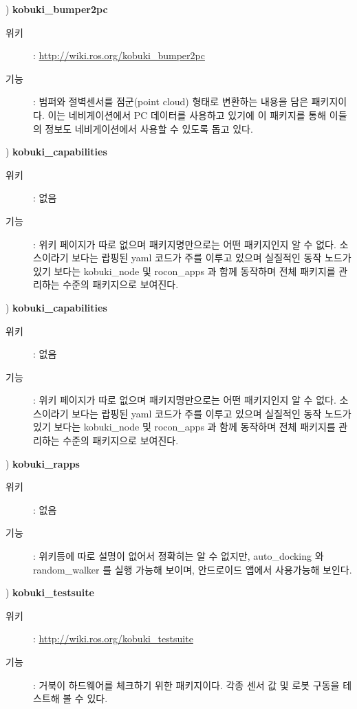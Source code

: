 \vspace{\baselineskip}
\noindent{}
\thenum) \textbf{kobuki\_bumper2pc}
\begin{description}
\item[위키]: \url{http://wiki.ros.org/kobuki_bumper2pc}
\item[기능]: 범퍼와 절벽센서를 점군(point cloud) 형태로 변환하는 내용을 담은 패키지이다. 이는 네비게이션에서 PC 데이터를 사용하고 있기에 이 패키지를 통해 이들의 정보도 네비게이션에서 사용할 수 있도록 돕고 있다.
\end{description}

\vspace{\baselineskip}
\noindent{}
\thenum) \textbf{kobuki\_capabilities}
\begin{description}
\item[위키]: 없음
\item[기능]: 위키 페이지가 따로 없으며 패키지명만으로는 어떤 패키지인지 알 수 없다. 소스이라기 보다는 랍핑된 yaml 코드가 주를 이루고 있으며 실질적인 동작 노드가 있기 보다는 kobuki\_node 및 rocon\_apps 과 함께 동작하며 전체 패키지를 관리하는 수준의 패키지으로 보여진다.
\end{description}

\vspace{\baselineskip}
\noindent{}
\thenum) \textbf{kobuki\_capabilities}
\begin{description}
\item[위키]: 없음
\item[기능]: 위키 페이지가 따로 없으며 패키지명만으로는 어떤 패키지인지 알 수 없다. 소스이라기 보다는 랍핑된 yaml 코드가 주를 이루고 있으며 실질적인 동작 노드가 있기 보다는 kobuki\_node 및 rocon\_apps 과 함께 동작하며 전체 패키지를 관리하는 수준의 패키지으로 보여진다.
\end{description}

\vspace{\baselineskip}
\noindent{}
\thenum) \textbf{kobuki\_rapps}
\begin{description}
\item[위키]: 없음
\item[기능]: 위키등에 따로 설명이 없어서 정확히는 알 수 없지만, auto\_docking 와 random\_walker 를 실행 가능해 보이며, 안드로이드 앱에서 사용가능해 보인다.
\end{description}

\vspace{\baselineskip}
\noindent{}
\thenum) \textbf{kobuki\_testsuite}
\begin{description}
\item[위키]: \url{http://wiki.ros.org/kobuki_testsuite}
\item[기능]: 거북이 하드웨어를 체크하기 위한 패키지이다. 각종 센서 값 및 로봇 구동을 테스트해 볼 수 있다.
\end{description}

